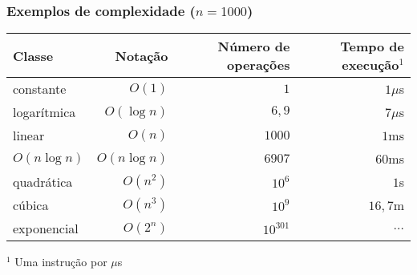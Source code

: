 \begin{frame}

	\frametitle{Exemplos de complexidade ($n = 1000$)}
	\begin{small}

	\begin{table}[ht]
	\centering
	\begin{tabular}{lrrr}
	\toprule
	\textbf{Classe} & \textbf{Notação} & \textbf{Número de operações} 
	& \textbf{Tempo de execução$^1$} \\
	\toprule
	constante & $O(1)$ & $1$ & $1\mu$s \\
	logarítmica & $O(\log n)$ & $6,9$ & $7\mu$s \\
	linear & $O(n)$ & $1000$ & $1$ms \\
	$O(n\log n)$ & $O(n\log n)$ & $6907$ & $60$ms \\
	quadrática & $O(n^2)$ & $10^6$ & $1$s \\
    cúbica & $O(n^3)$ & $10^9$ & $16,7$m \\
	exponencial & $O(2^n)$ & $10^{301}$ & $\ldots$ \\
	\bottomrule
	\end{tabular}
	\end{table}
	$^1$ Uma instrução por $\mu$s

	\end{small}

\end{frame}

